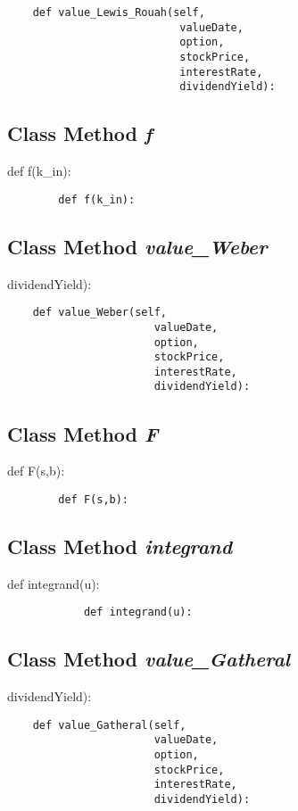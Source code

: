 \documentclass[twoside,11pt]{book}
\begin{document}
\begin{lstlisting}
    def value_Lewis_Rouah(self,
                           valueDate,
                           option,
                           stockPrice,
                           interestRate,
                           dividendYield):
\end{lstlisting}

\subsection{Class Method {\it f}}
def f(k\_in):

\begin{lstlisting}
        def f(k_in):
\end{lstlisting}

\subsection{Class Method {\it value\_Weber}}
dividendYield):

\begin{lstlisting}
    def value_Weber(self,
                       valueDate,
                       option,
                       stockPrice,
                       interestRate,
                       dividendYield):
\end{lstlisting}

\subsection{Class Method {\it F}}
def F(s,b):

\begin{lstlisting}
        def F(s,b):
\end{lstlisting}

\subsection{Class Method {\it integrand}}
def integrand(u):

\begin{lstlisting}
            def integrand(u):
\end{lstlisting}

\subsection{Class Method {\it value\_Gatheral}}
dividendYield):

\begin{lstlisting}
    def value_Gatheral(self,
                       valueDate,
                       option,
                       stockPrice,
                       interestRate,
                       dividendYield):
\end{lstlisting}
\end{document}
